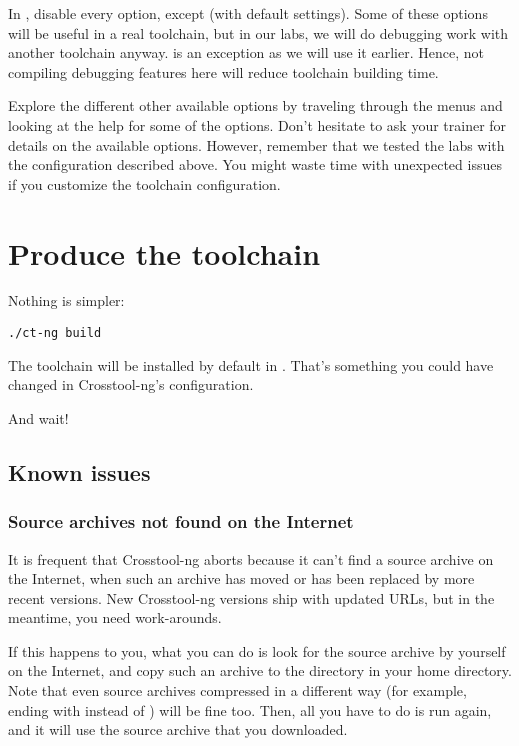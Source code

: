 In , disable every option, except 
(with default settings). Some of these options will be useful in a real
toolchain, but in our labs, we will do debugging work with another
toolchain anyway.  is an exception as we will use it earlier.
Hence, not compiling debugging features here will reduce toolchain building time.

Explore the different other available options by traveling through the
menus and looking at the help for some of the options. Don't hesitate
to ask your trainer for details on the available options. However,
remember that we tested the labs with the configuration described
above. You might waste time with unexpected issues if you customize the
toolchain configuration.

\section{Produce the toolchain}

Nothing is simpler:

\begin{verbatim}
./ct-ng build
\end{verbatim}

The toolchain will be installed by default in .
That's something you could have changed in Crosstool-ng's configuration.

And wait!

\subsection{Known issues}

\subsubsection{Source archives not found on the Internet}

It is frequent that Crosstool-ng aborts because it can't find a
source archive on the Internet, when such an archive has moved or has
been replaced by more recent versions. New Crosstool-ng versions ship
with updated URLs, but in the meantime, you need work-arounds.

If this happens to you, what you can do is look for the source archive by
yourself on the Internet, and copy such an archive to the 
directory in your home directory. Note that even source archives
compressed in a different way (for example, ending with 
instead of ) will be fine too. Then, all you have to do is run
 again, and it will use the source archive that you
downloaded.

